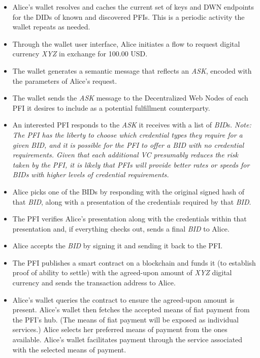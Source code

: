 \documentclass[11pt]{article}
\begin{document}
\begin{itemize}
	\item Alice’s wallet resolves and caches the current set of keys and DWN endpoints for the DIDs of known and discovered PFIs. This is a periodic activity the wallet repeats as needed.

	\item Through the wallet user interface, Alice initiates a flow to request digital currency \textit{XYZ} in exchange for 100.00 USD.

	\item The wallet generates a semantic message that reflects an \textit{ASK}, encoded with the parameters of Alice’s request.  

	\item The wallet sends the \textit{ASK} message to the Decentralized Web Nodes of each PFI it desires to include as a potential fulfillment counterparty.

	\item An interested PFI responds to the \textit{ASK} it receives with a list of \textit{BID}s.\textit{ Note: The PFI has the liberty to choose which credential types they require for a given BID, and it is possible for the PFI to offer a BID with no credential requirements. Given that each additional VC presumably reduces the risk taken by the PFI, it is likely that PFIs will provide better rates or speeds for BIDs with higher levels of credential requirements. }

	\item Alice picks one of the BIDs by responding with the original signed hash of that \textit{BID}, along with a presentation of the credentials required by that \textit{BID}. 

	\item The PFI verifies Alice’s presentation along with the credentials within that presentation and, if everything checks out, sends a final \textit{BID} to Alice.

	\item Alice accepts the \textit{BID} by signing it and sending it back to the PFI.

	\item The PFI publishes a smart contract on a blockchain and funds it (to establish proof of ability to settle) with the agreed-upon amount of \textit{XYZ} digital currency and sends the transaction address to Alice.

	\item Alice’s wallet queries the contract to ensure the agreed-upon amount is present. Alice’s wallet then fetches the accepted means of fiat payment from the PFI’s hub. (The means of fiat payment will be exposed as individual services.) Alice selects her preferred means of payment from the ones available. Alice’s wallet facilitates payment through the service associated with the selected means of payment.


\end{itemize}
\end{document}
